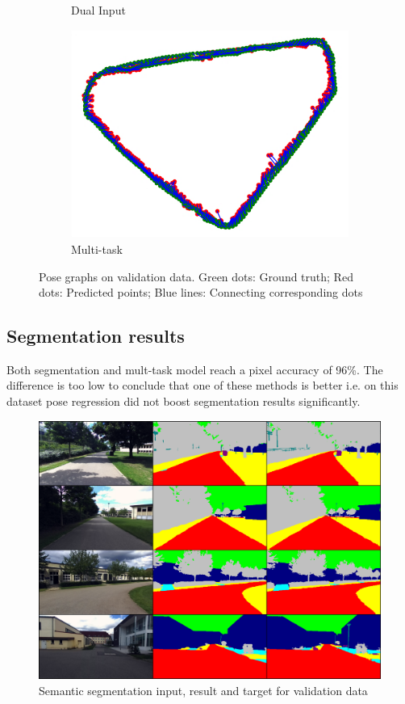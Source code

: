 \documentclass[10pt,twocolumn,letterpaper]{article}
\begin{document}
\begin{figure}[t]
\begin{center}
\begin{subfigure}{.23\textwidth}
\begin{center}
	\caption{Dual Input}
\end{center}
\end{subfigure}
	\begin{subfigure}{.23\textwidth}
	\begin{center}
		\includegraphics[width=0.8\linewidth]{images/multitask.png}
		\caption{Multi-task}
	\end{center}
\end{subfigure}
\end{center}

	\caption{Pose graphs on validation data. Green dots: Ground truth; Red dots: Predicted points; Blue lines: Connecting corresponding dots}
	\label{fig:pose_graphs}
\end{figure}
\subsection{Segmentation results}
Both segmentation and mult-task model reach a pixel accuracy of 96\%. The difference is too low to conclude that one of these methods is better i.e. on this dataset pose regression did not boost segmentation results significantly.
\begin{figure}[t]
	\begin{center}
		\includegraphics[width=0.8\linewidth]{images/semantic_results_semanticOutput.png}
	\end{center}
	\caption{Semantic segmentation input, result and target for validation data}
	\label{fig:sem_seg}
\end{figure}
\end{document}
